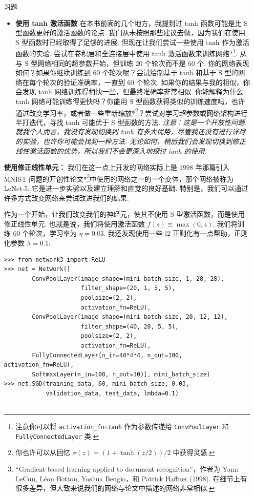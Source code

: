 \begin{exerciseBox}{习题}

\begin{itemize}

\item \textbf{使用 tanh 激活函数} 在本书前面的几个地方，我提到过 tanh 函数可能是比 S 型函数更好的激活函数的论点. 我们从未按照那些建议去做，因为我们在使用 S 型函数时已经取得了足够的进展. 但现在让我们尝试一些使用 tanh 作为激活函数的实验. 尝试在卷积层和全连接层中使用 tanh 激活函数来训练网络*\footnote{注意你可以将 \texttt{activation\_\allowbreak{}fn=tanh} 作为参数传递给 \texttt{ConvPoolLayer} 和 \texttt{FullyConnectedLayer} 类.}. 从与 S 型网络相同的超参数开始，但训练 $20$ 个轮次而不是 $60$ 个. 你的网络表现如何？如果你继续训练到 $60$ 个轮次呢？尝试绘制基于 tanh 和基于 S 型的网络在每个轮次的验证准确率，一直到 $60$ 个轮次. 如果你的结果与我的相似，你会发现 tanh 网络训练得稍快一些，但最终准确率非常相似. 你能解释为什么 tanh 网络可能训练得更快吗？你能用 S 型函数获得类似的训练速度吗，也许通过改变学习率，或者做一些重新缩放*\footnote{你也许可以从回忆 $\sigma(z) = (1+\tanh(z/2))/2$ 中获得灵感.}？尝试对学习超参数或网络架构进行半打迭代，寻找 tanh 可能优于 S 型函数的方法. \emph{注意：这是一个开放性问题. 就我个人而言，我没有发现切换到 tanh 有多大优势，尽管我还没有进行详尽的实验，也许你可能会找到一种方法. 无论如何，稍后我们会发现切换到修正线性激活函数的优势，所以我们不会更深入地探讨 tanh 的使用.}

\end{itemize}

\textbf{使用修正线性单元：} 我们在这一点上开发的网络实际上是 1998 年那篇引入 MNIST 问题的开创性论文*\footnote{``Gradient-based learning applied to document recognition''，作者为 Yann LeCun, Léon Bottou, Yoshua Bengio，和 Patrick Haffner (1998). 在细节上有很多差异，但大致来说我们的网络与论文中描述的网络非常相似.}中使用的网络之一的一个变体，那个网络被称为 LeNet-5. 它是进一步实验以及建立理解和直觉的良好基础. 特别是，我们可以通过许多方式改变网络来尝试改进我们的结果.

作为一个开始，让我们改变我们的神经元，使其不使用 S 型激活函数，而是使用修正线性单元. 也就是说，我们将使用激活函数 $f(z) \equiv \max(0, z)$. 我们将训练 $60$ 个轮次，学习率为 $\eta = 0.03$. 我还发现使用一些 l2 正则化有一点帮助，正则化参数 $\lambda = 0.1$:

\begin{lstlisting}
>>> from network3 import ReLU
>>> net = Network([
        ConvPoolLayer(image_shape=(mini_batch_size, 1, 28, 28),
                      filter_shape=(20, 1, 5, 5),
                      poolsize=(2, 2),
                      activation_fn=ReLU),
        ConvPoolLayer(image_shape=(mini_batch_size, 20, 12, 12),
                      filter_shape=(40, 20, 5, 5),
                      poolsize=(2, 2),
                      activation_fn=ReLU),
        FullyConnectedLayer(n_in=40*4*4, n_out=100, activation_fn=ReLU),
        SoftmaxLayer(n_in=100, n_out=10)], mini_batch_size)
>>> net.SGD(training_data, 60, mini_batch_size, 0.03,
            validation_data, test_data, lmbda=0.1)


\end{lstlisting}
\end{exerciseBox}
